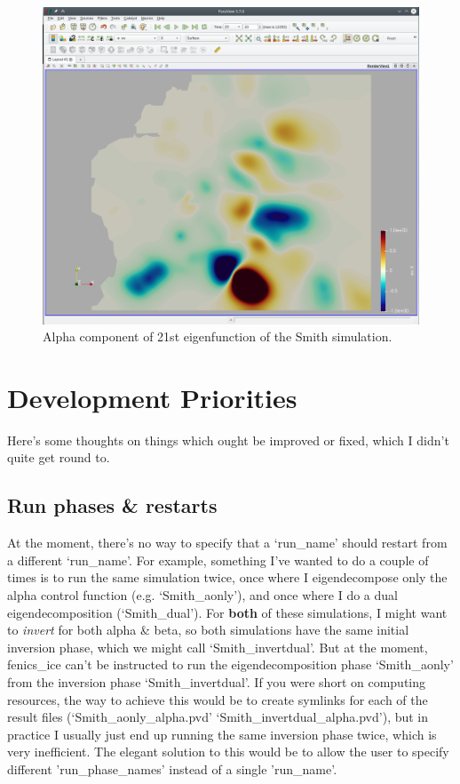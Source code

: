 \documentclass[11pt, reqno, nocenter]{article}
\begin{document}
\begin{figure}[!htbp]
  \centering
  \includegraphics[width=14cm]{./figures/smith_21_ev_alpha.png}
  \caption[]{Alpha component of 21st eigenfunction of the Smith simulation.}
      \label{fig:smith_ed}
\end{figure}

\section{Development Priorities}

Here's some thoughts on things which ought be improved or fixed, which I didn't quite get round to.

\subsection{Run phases \& restarts}

At the moment, there's no way to specify that a `run\_name' should restart from a different `run\_name'. For example, something I've wanted to do a couple of times is to run the same simulation twice, once where I eigendecompose only the alpha control function (e.g. `Smith\_aonly'), and once where I do a dual eigendecomposition (`Smith\_dual'). For \textbf{both} of these simulations, I might want to \emph{invert} for both alpha \& beta, so both simulations have the same initial inversion phase, which we might call `Smith\_invertdual'. But at the moment, fenics\_ice can't be instructed to run the eigendecomposition phase `Smith\_aonly' from the inversion phase `Smith\_invertdual'. If you were short on computing resources, the way to achieve this would be to create symlinks for each of the result files (`Smith\_aonly\_alpha.pvd' \textrightarrow  `Smith\_invertdual\_alpha.pvd'), but in practice I usually just end up running the same inversion phase twice, which is very inefficient. The elegant solution to this would be to allow the user to specify different 'run\_phase\_names' instead of a single 'run\_name'.
\end{document}
